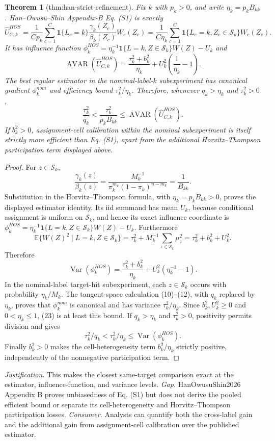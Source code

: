 \documentclass{article}
\newtheorem{theorem}{Theorem}
\begin{document}
\begin{theorem}[thm:han-strict-refinement]\label{thm:han-strict-refinement}
Fix \(k\) with \(p_k>0\), and write \(\eta_k=p_kB_{kk}\). Han--Owusu--Shin Appendix-B Eq. (S1) is exactly \[\widehat U^{HOS}_{C,k}=\frac{1}{Cp_k}\sum_{c=1}^C\mathbf 1\{L_c=k\}\frac{\gamma_k(Z_c)}{\beta_k(Z_c)}W_c(Z_c)=\frac{1}{C\eta_k}\sum_{c=1}^C\mathbf 1\{L_c=k,Z_c\in\mathcal S_k\}W_c(Z_c).\] It has influence function \(\phi_k^{HOS}=\eta_k^{-1}\mathbf 1\{L=k,Z\in\mathcal S_k\}W(Z)-U_k\) and \[\operatorname{AVAR}(\widehat U^{HOS}_{C,k})=\frac{\tau_k^2+b_k^2}{\eta_k}+U_k^2\left(\frac1{\eta_k}-1\right).\] The best regular estimator in the nominal-label-\(k\) subexperiment has canonical gradient \(\phi_k^{nom}\) and efficiency bound \(\tau_k^2/\eta_k\). Therefore, whenever \(q_k>\eta_k\) and \(\tau_k^2>0\), \[\frac{\tau_k^2}{q_k}<\frac{\tau_k^2}{p_kB_{kk}}\leq\operatorname{AVAR}(\widehat U^{HOS}_{C,k}).\] If \(b_k^2>0\), assignment-cell calibration within the nominal subexperiment is itself strictly more efficient than Eq. (S1), apart from the additional Horvitz--Thompson participation term displayed above.
\end{theorem}
\begin{proof}
For \(z\in\mathcal S_k\),
\[
 \frac{\gamma_k(z)}{\beta_k(z)}
 =\frac{M_k^{-1}}{\pi_k^{m_k}(1-\pi_k)^{n-m_k}}=\frac1{B_{kk}}. \tag{22}
\]
Substitution in the Horvitz--Thompson formula, with \(\eta_k=p_kB_{kk}>0\), proves the displayed estimator identity.  Its iid summand has mean \(U_k\), because conditional assignment is uniform on \(\mathcal S_k\), and hence its exact influence coordinate is
\(\phi_k^{HOS}=\eta_k^{-1}\mathbf1\{L=k,Z\in\mathcal S_k\}W(Z)-U_k\).  Furthermore
\[
 \mathbb E\{W(Z)^2\mid L=k,Z\in\mathcal S_k\}
 =\tau_k^2+M_k^{-1}\sum_{z\in\mathcal S_k}\mu_z^2
 =\tau_k^2+b_k^2+U_k^2.
\]
Therefore
\[
 \operatorname{Var}(\phi_k^{HOS})
 =\frac{\tau_k^2+b_k^2}{\eta_k}+U_k^2(\eta_k^{-1}-1). \tag{23}
\]
In the nominal-label target-hit subexperiment, each \(z\in\mathcal S_k\) occurs with probability \(\eta_k/M_k\).  The tangent-space calculation (10)--(12), with \(q_k\) replaced by \(\eta_k\), proves that \(\phi_k^{nom}\) is canonical and has variance \(\tau_k^2/\eta_k\).  Since \(b_k^2,U_k^2\geq0\) and \(0<\eta_k\leq1\), (23) is at least this bound.  If \(q_k>\eta_k\) and \(\tau_k^2>0\), positivity permits division and gives
\[
 \tau_k^2/q_k<\tau_k^2/\eta_k\leq\operatorname{Var}(\phi_k^{HOS}).
\]
Finally \(b_k^2>0\) makes the cell-heterogeneity term \(b_k^2/\eta_k\) strictly positive, independently of the nonnegative participation term.
\end{proof}
\par\smallskip\noindent \textit{Justification.} This makes the closest same-target comparison exact at the estimator, influence-function, and variance levels. \textit{Gap.} HanOwusuShin2026 Appendix B proves unbiasedness of Eq. (S1) but does not derive the pooled efficient bound or separate its cell-heterogeneity and Horvitz--Thompson participation losses. \textit{Consumer.} Analysts can quantify both the cross-label gain and the additional gain from assignment-cell calibration over the published estimator.
\end{document}
